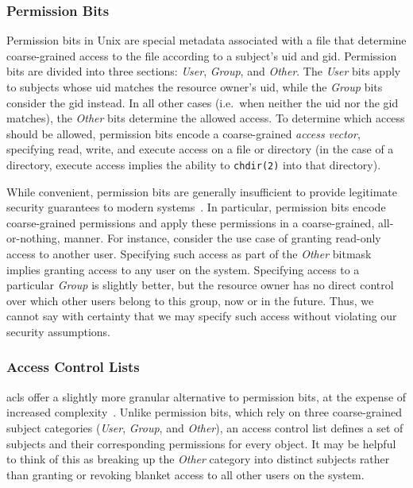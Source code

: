 \subsubsection*{Permission Bits}

Permission bits in Unix are special metadata associated with a file that determine
coarse-grained access to the file according to a subject's \gls{uid} and \gls{gid}.
Permission bits are divided into three sections: \textit{User}, \textit{Group}, and
\textit{Other}. The \textit{User} bits apply to subjects whose \gls{uid} matches the
resource owner's \gls{uid}, while the \textit{Group} bits consider the \gls{gid} instead.
In all other cases (i.e.~when neither the \gls{uid} nor the \gls{gid} matches), the
\textit{Other} bits determine the allowed access. To determine which access should be
allowed, permission bits encode a coarse-grained \textit{access vector}, specifying read,
write, and execute access on a file or directory (in the case of a directory, execute
access implies the ability to \texttt{chdir(2)} into that directory).

While convenient, permission bits are generally insufficient to provide legitimate
security guarantees to modern systems~\cite{van_oorschot2020_tools_jewels,
jaeger2008_os_security}. In particular, permission bits encode coarse-grained permissions
and apply these permissions in a coarse-grained, all-or-nothing, manner. For instance,
consider the use case of granting read-only access to another user. Specifying such access
as part of the \textit{Other} bitmask implies granting access to any user on the system.
Specifying access to a particular \textit{Group} is slightly better, but the resource
owner has no direct control over which other users belong to this group, now or in the
future. Thus, we cannot say with certainty that we may specify such access without
violating our security assumptions.

\subsubsection*{Access Control Lists}

\Glspl{acl} offer a slightly more granular alternative to permission bits,
at the expense of increased complexity~\cite{jaeger2008_os_security,
van_oorschot2020_tools_jewels}. Unlike permission bits, which rely on three coarse-grained
subject categories (\textit{User}, \textit{Group}, and \textit{Other}), an access control
list defines a set of subjects and their corresponding permissions for every object. It
may be helpful to think of this as breaking up the \textit{Other} category into distinct
subjects rather than granting or revoking blanket access to all other users on the system.

